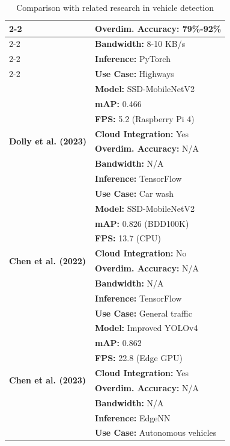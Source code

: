 \begin{table}[htbp]
\begin{tabular}{|l|l|}
    \cline{2-2}
    & \textbf{Overdim. Accuracy:} 79\%-92\% \\
    \cline{2-2}
    & \textbf{Bandwidth:} 8-10 KB/s \\
    \cline{2-2}
    & \textbf{Inference:} PyTorch \\
    \cline{2-2}
    & \textbf{Use Case:} Highways \\
    \hline
    \multirow{8}{*}{\textbf{Dolly et al. (2023) \cite{dolly2023}}} & \textbf{Model:} SSD-MobileNetV2 \\
    \cline{2-2}
    & \textbf{mAP:} 0.466 \\
    \cline{2-2}
    & \textbf{FPS:} 5.2 (Raspberry Pi 4) \\
    \cline{2-2}
    & \textbf{Cloud Integration:} Yes \\
    \cline{2-2}
    & \textbf{Overdim. Accuracy:} N/A \\
    \cline{2-2}
    & \textbf{Bandwidth:} N/A \\
    \cline{2-2}
    & \textbf{Inference:} TensorFlow \\
    \cline{2-2}
    & \textbf{Use Case:} Car wash \\
    \hline
    \multirow{8}{*}{\textbf{Chen et al. (2022) \cite{Chen2022Fast}}} & \textbf{Model:} SSD-MobileNetV2 \\
    \cline{2-2}
    & \textbf{mAP:} 0.826 (BDD100K) \\
    \cline{2-2}
    & \textbf{FPS:} 13.7 (CPU) \\
    \cline{2-2}
    & \textbf{Cloud Integration:} No \\
    \cline{2-2}
    & \textbf{Overdim. Accuracy:} N/A \\
    \cline{2-2}
    & \textbf{Bandwidth:} N/A \\
    \cline{2-2}
    & \textbf{Inference:} TensorFlow \\
    \cline{2-2}
    & \textbf{Use Case:} General traffic \\
    \hline
    \multirow{8}{*}{\textbf{Chen et al. (2023) \cite{Chen2023Edge}}} & \textbf{Model:} Improved YOLOv4 \\
    \cline{2-2}
    & \textbf{mAP:} 0.862 \\
    \cline{2-2}
    & \textbf{FPS:} 22.8 (Edge GPU) \\
    \cline{2-2}
    & \textbf{Cloud Integration:} Yes \\
    \cline{2-2}
    & \textbf{Overdim. Accuracy:} N/A \\
    \cline{2-2}
    & \textbf{Bandwidth:} N/A \\
    \cline{2-2}
    & \textbf{Inference:} EdgeNN \\
    \cline{2-2}
    & \textbf{Use Case:} Autonomous vehicles \\
    \hline
  \end{tabular}
  \caption{Comparison with related research in vehicle detection}
  \label{tab:perbandingan_penelitian}
\end{table}

